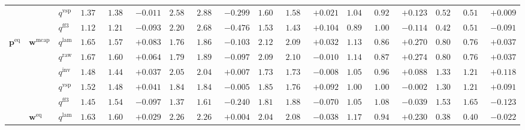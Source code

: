 \documentclass{article}
\begin{document}
\begin{table}[!htbp]
{\begin{tabular}{lll ccc ccc ccc ccc ccc}
 &  & $q^{\mathrm{vsp}}$ & $1.377$ & $1.388$ & \cellcolor{negred!50}$-0.011$ & $2.585$ & $2.885$ & \cellcolor{negred!50}$-0.299$ & $1.603$ & $1.582$ & \cellcolor{posgreen!50}$+0.021$ & $1.045$ & $0.922$ & \cellcolor{posgreen!50}$+0.123$ & $0.525$ & $0.516$ & \cellcolor{posgreen!50}$+0.009$ \\
 &  & $q^{\mathrm{ff3}}$ & $1.122$ & $1.215$ & \cellcolor{negred!50}$-0.093$ & $2.204$ & $2.680$ & \cellcolor{negred!50}$-0.476$ & $1.535$ & $1.431$ & \cellcolor{posgreen!50}$+0.104$ & $0.892$ & $1.006$ & \cellcolor{negred!50}$-0.114$ & $0.428$ & $0.519$ & \cellcolor{negred!50}$-0.091$ \\
\midrule
$\mathbf{p}^{\mathrm{eq}}$ & $\mathbf{w}^{\mathrm{mcap}}$ & $q^{\mathrm{lam}}$ & $1.655$ & $1.572$ & \cellcolor{posgreen!50}$+0.083$ & $1.764$ & $1.867$ & \cellcolor{negred!50}$-0.103$ & $2.124$ & $2.092$ & \cellcolor{posgreen!50}$+0.032$ & $1.134$ & $0.863$ & \cellcolor{posgreen!50}$+0.270$ & $0.805$ & $0.768$ & \cellcolor{posgreen!50}$+0.037$ \\
 &  & $q^{\mathrm{raw}}$ & $1.670$ & $1.606$ & \cellcolor{posgreen!50}$+0.064$ & $1.796$ & $1.892$ & \cellcolor{negred!50}$-0.097$ & $2.097$ & $2.107$ & \cellcolor{negred!50}$-0.010$ & $1.146$ & $0.872$ & \cellcolor{posgreen!50}$+0.274$ & $0.805$ & $0.768$ & \cellcolor{posgreen!50}$+0.037$ \\
 &  & $q^{\mathrm{inv}}$ & $1.481$ & $1.444$ & \cellcolor{posgreen!50}$+0.037$ & $2.057$ & $2.049$ & \cellcolor{posgreen!50}$+0.007$ & $1.730$ & $1.738$ & \cellcolor{negred!50}$-0.008$ & $1.051$ & $0.963$ & \cellcolor{posgreen!50}$+0.088$ & $1.332$ & $1.214$ & \cellcolor{posgreen!50}$+0.118$ \\
 &  & $q^{\mathrm{vsp}}$ & $1.528$ & $1.487$ & \cellcolor{posgreen!50}$+0.041$ & $1.844$ & $1.849$ & \cellcolor{negred!50}$-0.005$ & $1.858$ & $1.765$ & \cellcolor{posgreen!50}$+0.092$ & $1.001$ & $1.003$ & \cellcolor{negred!50}$-0.002$ & $1.301$ & $1.210$ & \cellcolor{posgreen!50}$+0.091$ \\
 &  & $q^{\mathrm{ff3}}$ & $1.451$ & $1.548$ & \cellcolor{negred!50}$-0.097$ & $1.378$ & $1.618$ & \cellcolor{negred!50}$-0.240$ & $1.819$ & $1.889$ & \cellcolor{negred!50}$-0.070$ & $1.050$ & $1.088$ & \cellcolor{negred!50}$-0.039$ & $1.531$ & $1.653$ & \cellcolor{negred!50}$-0.123$ \\
\cmidrule(lr){2-18}
 & $\mathbf{w}^{\mathrm{eq}}$ & $q^{\mathrm{lam}}$ & $1.637$ & $1.608$ & \cellcolor{posgreen!50}$+0.029$ & $2.268$ & $2.264$ & \cellcolor{posgreen!50}$+0.004$ & $2.048$ & $2.087$ & \cellcolor{negred!50}$-0.038$ & $1.175$ & $0.945$ & \cellcolor{posgreen!50}$+0.230$ & $0.384$ & $0.406$ & \cellcolor{negred!50}$-0.022$ \\

\end{tabular}}
\end{table}
\end{document}
